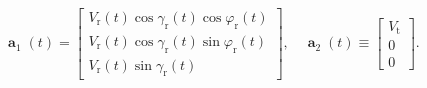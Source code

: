 \[{{\mathop{\mathbf a}\nolimits} _1}\left(  t \right) = \left[ {\begin{array}{*{20}{c}}
	{{V_\text{r}}\left( t \right)\cos {\gamma _\text{r}}\left( t \right)\cos {\varphi _\text{r}}\left( t \right)}\\
	{{V_\text{r}}\left( t \right)\cos {\gamma _\text{r}}\left( t \right)\sin {\varphi _\text{r}}\left( t \right)}\\
	{{V_\text{r}}\left( t \right)\sin {\gamma _\text{r}}\left( t \right)}
	\end{array}} \right], \quad {{\mathop{\mathbf a}\nolimits} _2}\left( t \right) \equiv \left[ {\begin{array}{*{20}{c}}
	{{V_\text{t}}}\\
	0\\
	0
	\end{array}} \right].
\]

